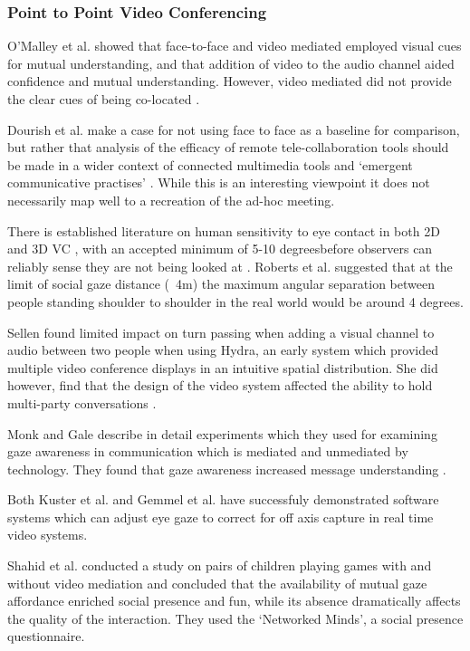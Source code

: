             \subsubsection{Point to Point Video Conferencing}
                O'Malley et al. showed that face-to-face and video mediated employed  visual cues for mutual understanding, and that addition of video to the audio channel aided confidence and mutual understanding. However, video mediated did not provide the clear cues of being co-located \cite{O'Malley1996}.\par
                Dourish et al. make a case for not using face to face as a baseline for comparison, but rather that analysis of the efficacy of remote tele-collaboration tools should be made in a wider context of connected multimedia tools and `emergent communicative practises' \cite{Dourish1993}. While this is an interesting viewpoint it does not necessarily map well to a recreation of the ad-hoc meeting.\par
There is established literature on human sensitivity to eye contact in both 2D and 3D VC \cite{Criminisi2003, Eijk2010}, with an accepted minimum of 5-10 degreesbefore observers can reliably sense they are not being looked at \cite{Chen2002}. Roberts et al. suggested that at the limit of social gaze distance (~4m) the maximum angular separation between people standing shoulder to shoulder in the real world would be around 4 degrees\cite{Roberts2013}. \par
                Sellen found limited impact on turn passing when adding a visual channel to audio between two people when using Hydra, an early system which provided multiple video conference displays in an intuitive spatial distribution\cite{Sellen1992a}. She did however, find that the design of the video system affected the ability to hold multi-party conversations \cite{Sellen1995a}.\par
                Monk and Gale describe in detail experiments which they used 
 for examining gaze awareness in communication which is mediated and unmediated by technology.  
  They   found that gaze awareness increased message understanding  
  \cite{Monk2002}.\par
                Both Kuster et al. and Gemmel et al. have successfuly demonstrated software systems which can adjust eye gaze to correct for off axis capture in real time video systems\cite{Gemmell2000, Kuster2012b}.\par
                Shahid et al. conducted a study on pairs of children playing games with and without video mediation and concluded that the availability of mutual gaze affordance enriched social presence and fun, while its absence dramatically affects the quality of the interaction. They used the `Networked Minds', a social presence questionnaire.                
